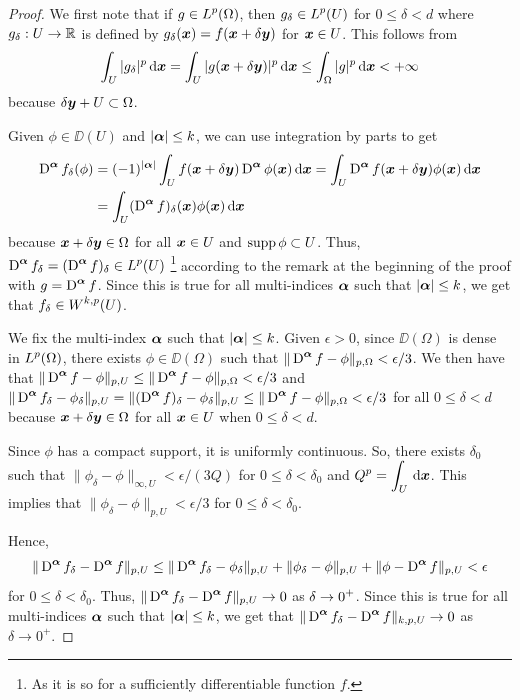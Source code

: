 \begin{proof}
We first note that if $\displaystyle g \in L^p(\Omega)$, then
$\displaystyle g_\delta \in L^p(U)$ for $0 \leq \delta <d$ where
$g_\delta:U \to \mathbb{R}$ is defined by
$g_\delta({\bm{x}}) = f({\bm{x}} + \delta {\bm{y}})$
for ${\bm{x}} \in U$.  This follows from
\[
\int_U |g_\delta|^p \,\mathrm{d}{{\bm{x}}}
= \int_U |g({\bm{x}} + \delta{\bm{y}})|^p \,\mathrm{d}{{\bm{x}}}
\leq \int_{\Omega} |g|^p \,\mathrm{d}{{\bm{x}}} < +\infty
\]
because $\delta {\bm{y}} + U \subset \Omega$.

Given $\phi \in \DD(U)$ and $|{\bm{\alpha}}| \leq k$, we can use integration by
parts to get
\begin{align*}
\operatorname{D}^{{\bm{\alpha}}} f_\delta (\phi)
&= (-1)^{|{\bm{\alpha}}|} \int_U f({\bm{x}}+\delta{\bm{y}})
\operatorname{D}^{{\bm{\alpha}}} \phi({\bm{x}}) \,\mathrm{d}{{\bm{x}}}
= \int_U \operatorname{D}^{{\bm{\alpha}}} f({\bm{x}}+\delta{\bm{y}}) \phi({\bm{x}})
\,\mathrm{d}{{\bm{x}}} \\
&= \int_U (\operatorname{D}^{{\bm{\alpha}}} f)_\delta({\bm{x}}) \phi({\bm{x}}) \,\mathrm{d}{{\bm{x}}}
\end{align*}
because ${\bm{x}}+\delta{\bm{y}} \in \Omega$ for all ${\bm{x}} \in U$
and $\operatorname{supp} \phi \subset U$.  Thus, 
$\displaystyle \operatorname{D}^{{\bm{\alpha}}} f_\delta
= (\operatorname{D}^{{\bm{\alpha}}} f)_\delta \in L^p(U)$
\footnote{As it is so for a sufficiently differentiable function $f$.}
according to the remark at the beginning of the proof with
$\displaystyle g = \operatorname{D}^{{\bm{\alpha}}} f$.  Since this is true for all
multi-indices ${\bm{\alpha}}$ such that $|{\bm{\alpha}}|\leq k$, we get that
$\displaystyle f_\delta \in W^{k,p}(U)$.

We fix the multi-index ${\bm{\alpha}}$ such that $|{\bm{\alpha}}|\leq k$.
Given $\epsilon >0$, since $\DD(\Omega)$ is dense in
$\displaystyle L^p(\Omega)$, there exists $\phi \in \DD(\Omega)$
such that
$\displaystyle \|\operatorname{D}^{{\bm{\alpha}}} f - \phi\|_{p,\Omega} < \epsilon/3$.
We then have that
$\displaystyle \|\operatorname{D}^{{\bm{\alpha}}} f - \phi\|_{p,U} \leq
\|\operatorname{D}^{{\bm{\alpha}}} f - \phi\|_{p,\Omega} < \epsilon/3$
and
$\displaystyle \|\operatorname{D}^{{\bm{\alpha}}} f_\delta - \phi_\delta \|_{p,U}
= \| (\operatorname{D}^{{\bm{\alpha}}} f)_\delta - \phi_\delta \|_{p,U}
\leq \|\operatorname{D}^{{\bm{\alpha}}} f - \phi\|_{p,\Omega} < \epsilon/3$
for all $0\leq \delta < d$
because ${\bm{x}}+\delta{\bm{y}} \in \Omega$ for all ${\bm{x}} \in U$
when $0\leq \delta < d$.

Since $\phi$ has a compact support, it is uniformly continuous.
So, there exists $\delta_0$ such that
$\| \phi_\delta - \phi\|_{\infty,U} < \epsilon/(3Q)$
for $0 \leq \delta < \delta_0$ and
$\displaystyle Q^p = \int_U \,\mathrm{d}{{\bm{x}}}$.  This implies that
$\| \phi_\delta - \phi\|_{p,U} < \epsilon/3$ for $0\leq \delta < \delta_0$.

Hence,
\[
\|\operatorname{D}^{{\bm{\alpha}}} f_\delta - \operatorname{D}^{{\bm{\alpha}}} f \|_{p,U} \leq
\|\operatorname{D}^{{\bm{\alpha}}} f_\delta - \phi_\delta \|_{p,U}
+ \| \phi_\delta - \phi\|_{p,U} 
+ \| \phi - \operatorname{D}^{{\bm{\alpha}}} f\|_{p,U} < \epsilon
\]
for $0\leq \delta < \delta_0$.  Thus,
$\displaystyle \|\operatorname{D}^{{\bm{\alpha}}} f_\delta
- \operatorname{D}^{{\bm{\alpha}}} f \|_{p,U} \to 0$ as
$\displaystyle \delta \to 0^+$.  Since this is true for all
multi-indices ${\bm{\alpha}}$ such that $|{\bm{\alpha}}|\leq k$, we get that
$\displaystyle \|\operatorname{D}^{{\bm{\alpha}}} f_\delta
- \operatorname{D}^{{\bm{\alpha}}} f \|_{k,p,U} \to 0$ as $\delta \to 0^+$.
\end{proof}

